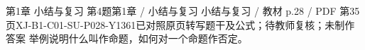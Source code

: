 \par\noindent\begin{minipage}{\linewidth}
\begin{bankitem}{第1章 小结与复习 第4题}{第1章 / 小结与复习 小结与复习 / 教材 p.28 / PDF 第35页}{XJ-B1-C01-SU-P028-Y1361}{已对照原页转写题干及公式；待教师复核；未制作答案}
举例说明什么叫作命题，如何对一个命题作否定。
\end{bankitem}
\end{minipage}\par\medskip
